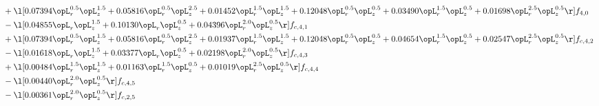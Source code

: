 \begin{alignat}{2}
& + \l[  0.07394 \opL_r^{0.5} \opL_z^{1.5} +  0.05816 \opL_r^{0.5} \opL_z^{2.5} +  0.01452 \opL_r^{1.5} \opL_z^{1.5} +  0.12048 \opL_r^{0.5} \opL_z^{0.5} +  0.03490 \opL_r^{1.5} \opL_z^{0.5} +  0.01698 \opL_r^{2.5} \opL_z^{0.5}  \r] f_{4,0} \nonumber \\ 
& - \l[  0.04855 \opL_r \opL_z^{1.5} +  0.10130 \opL_r \opL_z^{0.5} +  0.04396 \opL_r^{2.0} \opL_z^{0.5}  \r] f_{c,4,1} \nonumber \\ 
& + \l[  0.07394 \opL_r^{0.5} \opL_z^{1.5} +  0.05816 \opL_r^{0.5} \opL_z^{2.5} +  0.01937 \opL_r^{1.5} \opL_z^{1.5} +  0.12048 \opL_r^{0.5} \opL_z^{0.5} +  0.04654 \opL_r^{1.5} \opL_z^{0.5} +  0.02547 \opL_r^{2.5} \opL_z^{0.5}  \r] f_{c,4,2} \nonumber \\ 
& - \l[  0.01618 \opL_r \opL_z^{1.5} +  0.03377 \opL_r \opL_z^{0.5} +  0.02198 \opL_r^{2.0} \opL_z^{0.5}  \r] f_{c,4,3} \nonumber \\ 
& + \l[  0.00484 \opL_r^{1.5} \opL_z^{1.5} +  0.01163 \opL_r^{1.5} \opL_z^{0.5} +  0.01019 \opL_r^{2.5} \opL_z^{0.5}  \r] f_{c,4,4} \nonumber \\ 
& - \l[  0.00440 \opL_r^{2.0} \opL_z^{0.5}  \r] f_{c,4,5} \nonumber \\ 
& - \l[  0.00361 \opL_r^{2.0} \opL_z^{0.5}  \r] f_{c,2,5} \nonumber \\ 
\end{alignat} 



